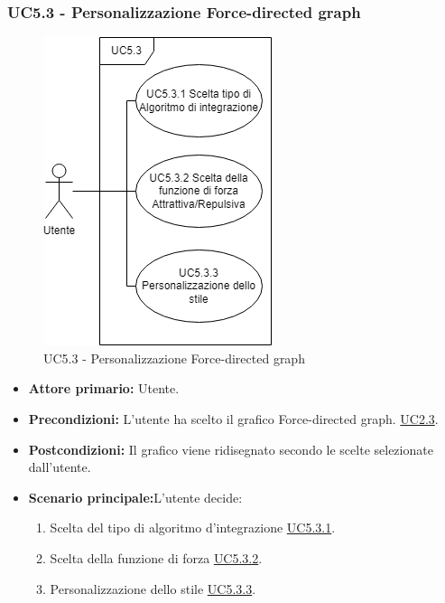 \subsubsection{UC5.3 - Personalizzazione Force-directed graph}
\label{sec:UC5.3}
\begin{figure}[h!]
	\centering
	\includegraphics[scale=0.55]{../../assets/personalizzazioneForce-directedGraph.drawio.png}
	\caption{UC5.3 - Personalizzazione Force-directed graph}
\end{figure}
\begin{itemize}
    \item \textbf{Attore primario:} Utente.
	\item \textbf{Precondizioni:} L'utente ha scelto il grafico Force-directed graph. \hyperref[sec:UC2.3]{UC2.3}.
	\item \textbf{Postcondizioni:} Il grafico viene ridisegnato secondo le scelte selezionate dall'utente.
	\item \textbf{Scenario principale:}L'utente decide:
	\begin{enumerate}
        \item Scelta del tipo di algoritmo d'integrazione \hyperref[sec:UC5.3.1]{UC5.3.1}.
        \item Scelta della funzione di forza \hyperref[sec:UC5.3.2]{UC5.3.2}.
        \item Personalizzazione dello stile \hyperref[sec:UC5.3.3]{UC5.3.3}.
    \end{enumerate}
\end{itemize}
